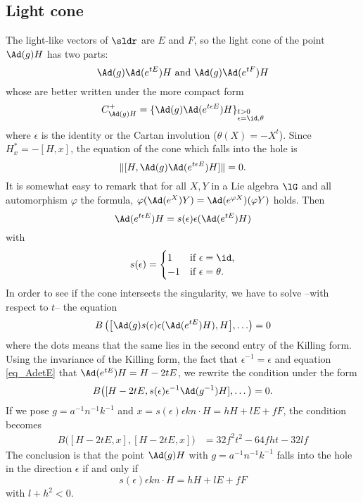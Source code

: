 \subsection{Light cone}

The light-like vectors of $\sldr$ are $E$ and $F$, so the light cone of the point $\Ad(g)H$ has two parts:
\[
	\Ad(g)\Ad(e^{tE})H\text{ and } \Ad(g)\Ad(e^{tF})H
\]
whose are better written under the more compact form
\begin{equation}
	C^+_{\Ad(g)H}=\{\Ad(g)\Ad(e^{t\epsilon E})H\}_{%
	\begin{subarray}{l}
		t>0\\
		\epsilon=\id,\theta
	\end{subarray}
	}
\end{equation}
where $\epsilon$ is the identity or the Cartan involution ($\theta(X)=-X^t$). Since $H^*_x=-[H,x]$, the equation of the cone which falls into the hole is
\begin{equation}
	\|[H,\Ad(g)\Ad(e^{t\epsilon E})H]\|=0.
\end{equation}
It is somewhat easy to remark that for all $X,Y$ in a Lie algebra $\lG$ and all automorphism $\varphi$ the formula, $\varphi(\Ad(e^X)Y)=\Ad(e^{\varphi X})(\varphi Y)$ holds.
Then
\begin{equation}
	\Ad(e^{t\epsilon E})H=s(\epsilon)\epsilon(\Ad(e^{tE})H)
\end{equation}
with
\[
	s(\epsilon)=
	\begin{cases}
		1  & \text{if }\epsilon=\id,    \\
		-1 & \text{if }\epsilon=\theta.
	\end{cases}
\]
In order to see if the cone intersects the singularity, we have to solve --with respect to $t$-- the equation
\begin{equation}
	B
	\left(%
	\big[  \Ad(g)s(\epsilon)\epsilon(\Ad(e^{tE})H),H\big],\ldots
	\right)=0
\end{equation}
where the dots means that the same lies in the second entry of the Killing form. Using the invariance of the Killing form, the fact that $\epsilon^{-1}=\epsilon$ and
equation \eqref{eq_AdetE} that $\Ad(e^{tE})H=H-2tE$, we rewrite the condition under the form
\begin{equation}
	B\big(	[H-2tE,s(\epsilon)\epsilon^{-1}\Ad(g^{-1})H],\ldots\big)=0.
\end{equation}
If we pose $g=a^{-1} n^{-1} k^{-1}$ and $x=s(\epsilon)\epsilon kn\cdot H=hH+lE+fF$, the condition becomes
\begin{equation}
	\begin{split}
		B\big( [H-2tE,x],[H-2tE,x] \big)&=32f^2t^2-64fht-32lf
	\end{split}
\end{equation}
The conclusion is that the point $\Ad(g)H$ with $g=a^{-1} n^{-1} k^{-1}$ falls into the hole in the direction $\epsilon$ if and only if
\[
	s(\epsilon)\epsilon kn\cdot H=hH+lE+fF
\]
with $l+h^2<0$.

